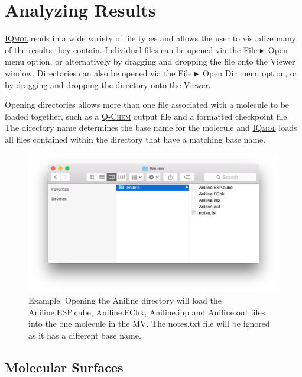 \documentclass[a4paper,12pt]{article}
\newcommand{\qchem}{\href{http://q-chem.com}{{\scshape Q-Chem}}}
\newcommand{\iqmol}{\href{http://iqmol.org}{{\scshape IQmol}}}
\newcommand{\bt}{\ensuremath{\blacktriangleright}}
\begin{document}
\newpage
\section{Analyzing Results}
\label{sec:anal}

\iqmol{} reads in a wide variety of file types and allows the user to visualize
many of the results they contain.  Individual files can be opened via the File
\bt\ Open menu option, or alternatively by dragging and dropping the file onto
the Viewer window.  Directories can also be opened via the File \bt\ Open Dir
menu option, or by dragging and dropping the directory onto the Viewer.  

Opening directories allows more than one file associated with a molecule to be
loaded together, such as a \qchem{} output file and a formatted checkpoint
file.  The directory name determines the base name for the molecule and
\iqmol{} loads all files contained within the directory that have a matching
base name.  
\begin{figure}[h]
\begin{center}
\includegraphics[scale=0.40]{figures/OpenDir.png}
\caption{Example: Opening the Aniline directory will load the Aniline.ESP.cube,
Aniline.FChk, Aniline.inp and Aniline.out files into the one molecule in the
MV.  The notes.txt file will be ignored as it has a different base name.} 
\end{center}
\end{figure}


\subsection{Molecular Surfaces}
\end{document}
